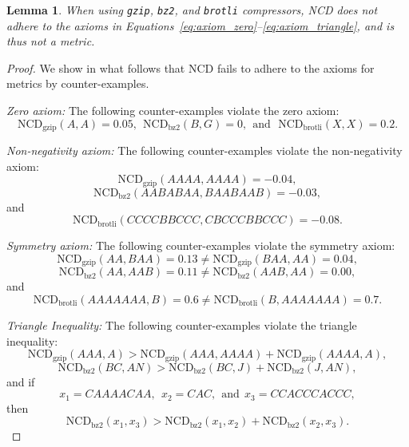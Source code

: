 \documentclass[preprint,12pt]{article}
\newtheorem{lemma}{Lemma}
\begin{document}
\begin{lemma}
    When using \texttt{gzip}, \texttt{bz2}, and \texttt{brotli} compressors, NCD does not adhere to the axioms in Equations~\ref{eq:axiom_zero}--\ref{eq:axiom_triangle}, and is thus not a metric.
    \label{pseudometric}
\end{lemma}
\begin{proof}


    We show in what follows that NCD fails to adhere to the axioms for metrics by counter-examples.

    \vspace{0.5em}
    \noindent%
    \textit{Zero axiom:} The following counter-examples violate the zero axiom:
    $$
    \text{NCD}_{\text{gzip}}(A,A) = 0.05,~~\text{NCD}_{\text{bz2}}(B,G) = 0,~~\text{and~~NCD}_{\text{brotli}}(X,X) = 0.2.
    $$

    \vspace{0.5em}
    \noindent%
    \textit{Non-negativity axiom:} The following counter-examples violate the non-nega\-tivity axiom:
    $$
        \text{NCD}_{\text{gzip}}(AAAA,AAAA) = -0.04,
    $$
    $$
        \text{NCD}_{\text{bz2}}(AABABAA,BAABAAB) = -0.03,
    $$
    and
    $$
        \text{NCD}_{\text{brotli}}(CCCCBBCCC, CBCCCBBCCC) = -0.08.
    $$
    
    \vspace{0.5em}
    \noindent%
    \textit{Symmetry axiom:} The following counter-examples violate the symmetry axiom:
    $$
        \text{NCD}_{\text{gzip}}(AA, BAA) = 0.13 \neq \text{NCD}_{\text{gzip}}(BAA, AA) = 0.04,
    $$
    $$
        \text{NCD}_{\text{bz2}}(AA, AAB) = 0.11 \neq \text{NCD}_{\text{bz2}}(AAB, AA) = 0.00,
    $$
    and
    $$
        \text{NCD}_{\text{brotli}}(AAAAAAA, B) = 0.6 \neq \text{NCD}_{\text{brotli}}(B, AAAAAAA) = 0.7.
    $$

    \vspace{0.5em}
    \noindent%
    \textit{Triangle Inequality:} The following counter-examples violate the triangle inequality:
    $$
        \text{NCD}_{\text{gzip}}(AAA, A) > \text{NCD}_{\text{gzip}}(AAA, AAAA) + \text{NCD}_{\text{gzip}}(AAAA, A),
    $$
    $$
        \text{NCD}_{\text{bz2}}(BC, AN) > \text{NCD}_{\text{bz2}}(BC, J) + \text{NCD}_{\text{bz2}}(J, AN),
    $$
    and if
    $$
     x_1 = CAAAACAA,~~x_2 = CAC,~~\text{and}~~x_3 = CCACCCACCC,
    $$
    then
    $$
        \text{NCD}_{\text{bz2}}(x_1,x_3) > \text{NCD}_{\text{bz2}}(x_1,x_2) + \text{NCD}_{\text{bz2}}(x_2,x_3).
    $$
\end{proof}
\end{document}
